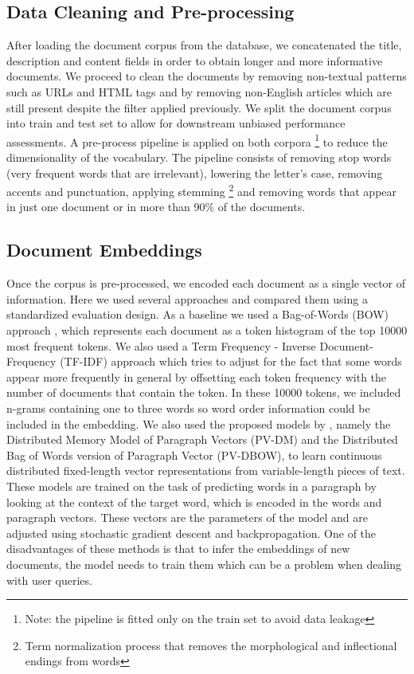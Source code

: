 \documentclass[a4paper]{article}
\begin{document}
\subsection*{Data Cleaning and Pre-processing}
After loading the document corpus from the database, we concatenated the title, description and content fields in order to obtain longer and more informative documents. We proceed to clean the documents by removing non-textual patterns such as URLs and HTML tags and by removing non-English articles which are still present despite the filter applied previously. We split the document corpus into train and test set to allow for downstream unbiased performance assessments. A pre-process pipeline is applied on both corpora \footnote{Note: the pipeline is fitted only on the train set to avoid data leakage} to reduce the dimensionality of the vocabulary. The pipeline consists of removing stop words (very frequent words that are irrelevant), lowering the letter's case, removing accents and punctuation, applying stemming \footnote{Term normalization process that removes the morphological and inflectional endings from words} and removing words that appear in just one document or in more than 90\% of the documents.
\subsection*{Document Embeddings}
Once the corpus is pre-processed, we encoded each document as a single vector of information. Here we used several approaches and compared them using a standardized evaluation design. As a baseline we used a Bag-of-Words (BOW) approach \citep{Harris1954}, which represents each document as a token histogram of the top 10000 most frequent tokens. We also used a Term Frequency - Inverse Document-Frequency (TF-IDF) approach \citep{KAREN1972} which tries to adjust for the fact that some words appear more frequently in general by offsetting each token frequency with the number of documents that contain the token. In these 10000 tokens, we included n-grams containing one to three words so word order information could be included in the embedding. We also used the proposed models by \citet{Le2014}, namely the Distributed Memory Model of Paragraph Vectors (PV-DM) and the Distributed Bag of Words version of Paragraph Vector (PV-DBOW), to learn continuous distributed fixed-length vector representations from variable-length pieces of text. These models are trained on the task of predicting words in a paragraph by looking at the context of the target word, which is encoded in the words and paragraph vectors. These vectors are the parameters of the model and are adjusted using stochastic gradient descent and backpropagation. One of the disadvantages of these methods is that to infer the embeddings of new documents, the model needs to train them which can be a problem when dealing with user queries. 
\end{document}
